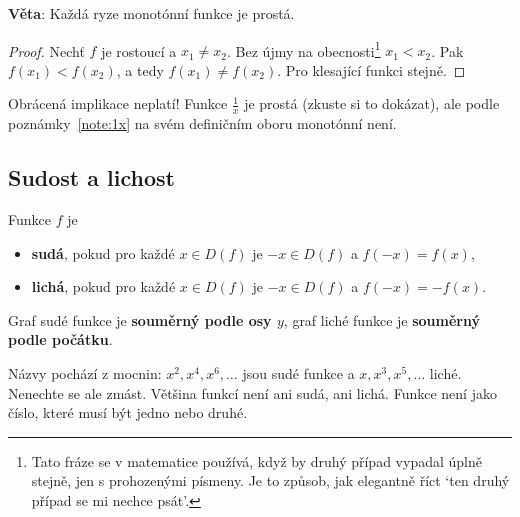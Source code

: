 \begin{definitionbox}
  \textbf{Věta}: Každá ryze monotónní funkce je prostá.
\end{definitionbox}

\begin{proof}
  Nechť $f$ je rostoucí a $x_1\neq x_2$. Bez újmy na obecnosti\footnote{Tato fráze se v matematice používá, když by druhý případ vypadal úplně stejně, jen s prohozenými písmeny. Je to způsob, jak elegantně říct `ten druhý případ se mi nechce psát'.} $x_1 < x_2$. Pak $f(x_1) < f(x_2)$, a tedy $f(x_1)\neq f(x_2)$. Pro klesající funkci stejně.
\end{proof}

Obrácená implikace neplatí! Funkce $\frac{1}{x}$ je prostá (zkuste si to dokázat), ale podle poznámky~\ref{note:1x} na svém definičním oboru monotónní není.

\subsection{Sudost a lichost}\label{sec:sudost-lichost}

\begin{definitionbox}
  Funkce $f$ je
  \begin{itemize}
    \item \textbf{sudá}, pokud pro každé $x\in D(f)$ je $-x\in D(f)$ a $f(-x) = f(x)$,
    \item \textbf{lichá}, pokud pro každé $x\in D(f)$ je $-x\in D(f)$ a $f(-x) = -f(x)$.
  \end{itemize}
  Graf sudé funkce je \textbf{souměrný podle osy $y$}, graf liché funkce je \textbf{souměrný podle počátku}.
\end{definitionbox}

Názvy pochází z mocnin: $x^2, x^4, x^6, \ldots$ jsou sudé funkce a $x, x^3, x^5, \ldots$ liché. Nenechte se ale zmást. Většina funkcí není ani sudá, ani lichá. Funkce není jako číslo, které musí být jedno nebo druhé.

